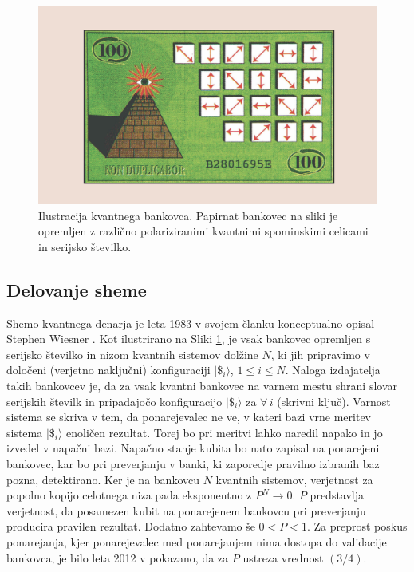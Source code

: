 \documentclass[12pt]{article}
\begin{document}
\begin{figure}[H]
\includegraphics[width=12cm]{qmon.png}
\centering
\caption{Ilustracija kvantnega bankovca. Papirnat bankovec na sliki je opremljen z različno polariziranimi kvantnimi spominskimi celicami in serijsko številko. \cite{aaronsonQuantumMoney2012}}
\label{fig:qmoney}
\end{figure}

\subsection{Delovanje sheme}

Shemo kvantnega denarja je leta 1983 v svojem članku konceptualno opisal Stephen Wiesner \cite{wiesnerConjugateCoding1983}. Kot ilustrirano na Sliki \ref{fig:qmoney}, je vsak bankovec opremljen s serijsko številko in nizom kvantnih sistemov dolžine $N$, ki jih pripravimo v določeni (verjetno naključni) konfiguraciji $| \$_i \rangle$, $1 \le i \le N$. Naloga izdajatelja takih bankovcev je, da za vsak kvantni bankovec na varnem mestu shrani slovar serijskih številk in pripadajočo konfiguracijo $| \$_i \rangle$ za $\forall \, i$ (skrivni ključ). Varnost sistema se skriva v tem, da ponarejevalec ne ve, v kateri bazi vrne meritev sistema $| \$_i \rangle$ enoličen rezultat. Torej bo pri meritvi lahko naredil napako in jo izvedel v napačni bazi. Napačno stanje kubita bo nato zapisal na ponarejeni bankovec, kar bo pri preverjanju v banki, ki zaporedje pravilno izbranih baz pozna, detektirano. Ker je na bankovcu $N$ kvantnih sistemov, verjetnost za popolno kopijo celotnega niza pada eksponentno z $P^N \rightarrow 0$. $P$ predstavlja verjetnost, da posamezen kubit na ponarejenem bankovcu pri preverjanju producira pravilen rezultat. Dodatno zahtevamo še $0 < P < 1$. Za preprost poskus ponarejanja, kjer ponarejevalec med ponarejanjem nima dostopa do validacije bankovca, je bilo leta 2012 v \cite{molinaOptimalCounterfeitingAttacks2012} pokazano, da za $P$ ustreza vrednost $(3/4)$.
\end{document}
